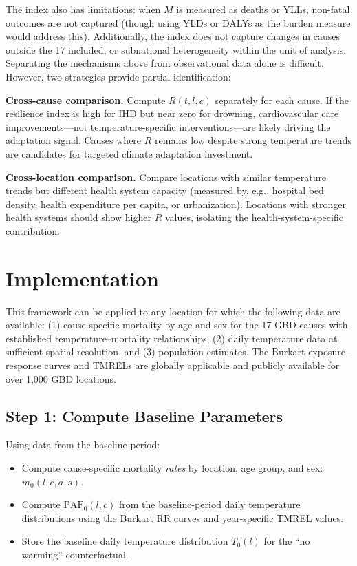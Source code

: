 \documentclass[11pt,a4paper]{article}
\begin{document}
The index also has limitations: when $M$ is measured as deaths or YLLs, non-fatal outcomes are not captured (though using YLDs or DALYs as the burden measure would address this). Additionally, the index does not capture changes in causes outside the 17 included, or subnational heterogeneity within the unit of analysis. Separating the mechanisms above from observational data alone is difficult. However, two strategies provide partial identification:

\textbf{Cross-cause comparison.} Compute $R(t,l,c)$ separately for each cause. If the resilience index is high for IHD but near zero for drowning, cardiovascular care improvements---not temperature-specific interventions---are likely driving the adaptation signal. Causes where $R$ remains low despite strong temperature trends are candidates for targeted climate adaptation investment.

\textbf{Cross-location comparison.} Compare locations with similar temperature trends but different health system capacity (measured by, e.g., hospital bed density, health expenditure per capita, or urbanization). Locations with stronger health systems should show higher $R$ values, isolating the health-system-specific contribution.

\section{Implementation}

This framework can be applied to any location for which the following data are available: (1) cause-specific mortality by age and sex for the 17 GBD causes with established temperature--mortality relationships, (2) daily temperature data at sufficient spatial resolution, and (3) population estimates. The Burkart exposure--response curves and TMRELs are globally applicable and publicly available for over 1,000 GBD locations.

\subsection{Step 1: Compute Baseline Parameters}

Using data from the baseline period:
\begin{itemize}[nosep]
  \item Compute cause-specific mortality \emph{rates} by location, age group, and sex: $m_0(l,c,a,s)$.
  \item Compute $\text{PAF}_0(l,c)$ from the baseline-period daily temperature distributions using the Burkart RR curves and year-specific TMREL values.
  \item Store the baseline daily temperature distribution $T_0(l)$ for the ``no warming'' counterfactual.
\end{itemize}
\end{document}
